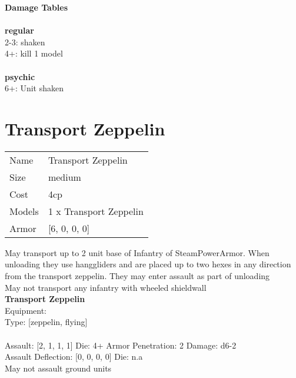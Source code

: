 {\bf Damage Tables} \\
\ \\ {\bf regular } \\
2-3: shaken \\
4+: kill 1 model \\
\ \\ {\bf psychic } \\
6+: Unit shaken \\










\pagebreak\pagebreak

\section{ Transport Zeppelin }

\begin{tabular}{ll}
  Name & Transport Zeppelin \\
  Size & medium\\
  Cost & 4cp\\
  Models & 1 x Transport Zeppelin\\
  Armor & [6, 0, 0, 0]\\
\end{tabular}

\noindent May transport up to 2 unit base of Infantry of SteamPowerArmor. When unloading they use hanggliders and are placed up to two hexes in any direction from the transport zeppelin. They may enter assault as part of unloading\\ 
May not transport any infantry with wheeled shieldwall\\ 


{\bf Transport Zeppelin } \\
Equipment:  \\
Type: [zeppelin, flying] \\
\ \\
Assault: [2, 1, 1, 1] Die: 4+ Armor Penetration: 2 Damage: d6-2 \\
Assault Deflection: [0, 0, 0, 0] Die: n.a\\
\indent May not assault ground units\\ 
 
\ \\

\ \\
 
\ \\




